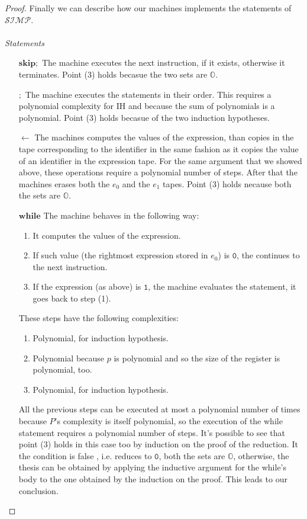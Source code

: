 \documentclass[10pt]{amsart}
\newcommand{\SIMP}{\mathcal{SIMP}}
\newcommand{\zero}{\mathtt{0}}
\newcommand{\one}{\mathtt{1}}
\newcommand{\OO}{\mathbb{O}}
\newcommand{\sk}{\mathbf{skip};}
\newcommand{\takes}{\leftarrow}
\begin{document}
\begin{proof}
Finally we can describe how our machines implements the statements of $\SIMP$.
\\\\
\emph{Statements}
\begin{itemize}
\item[$\sk$] The machine executes the next instruction, if it exists, otherwise it terminates. Point (3) holds becasue the two sets are $\OO$.
\item[$;$] The machine executes the statements in their order. This requires a polynomial complexity for IH and because the sum of polynomials is a polynomial. Point (3) holds becasue of the two induction hypotheses.
\item[$\takes $] The machines computes the values of the expression, than copies in the tape corresponding to the identifier in the same fashion as it copies the value of an identifier in the expression tape. For the same argument that we showed above, these operations require a polynomial number of steps. After that the machines erases both the $e_0$ and the $e_1$ tapes. Point (3) holds necause both the sets are $\OO$.
\item[$\mathbf{while}$] The machine behaves in the following way:
\begin{enumerate}
\item It computes the values of the expression.
\item If such value (the rightmost expression stored in $e_0$) is $\zero$, the continues to the next instruction.
\item If the expression (as above) is $\one$, the machine evaluates the statement, it goes back to step (1).
\end{enumerate}
These steps have the following complexities:
\begin{enumerate}
\item Polynomial, for induction hypothesis.
\item Polynomial because $p$ is polynomial and so the size of the register is polynomial, too.
\item Polynomial, for induction hypothesis.
\end{enumerate}
All the previous steps can be executed at most a polynomial number of times because $P$'s complexity is itself polynomial, so the execution of the while statement requires a polynomial number of steps. It's possible to see that point (3) holds in this case too by induction on the proof of the reduction. It the condition is false , i.e. reduces to \(\zero\), both the sets are $\OO$, otherwise, the thesis can be obtained by applying the inductive argument for the while's body to the one obtained by the induction on the proof. This leads to our conclusion.  


\end{itemize}
\end{proof}
\end{document}
